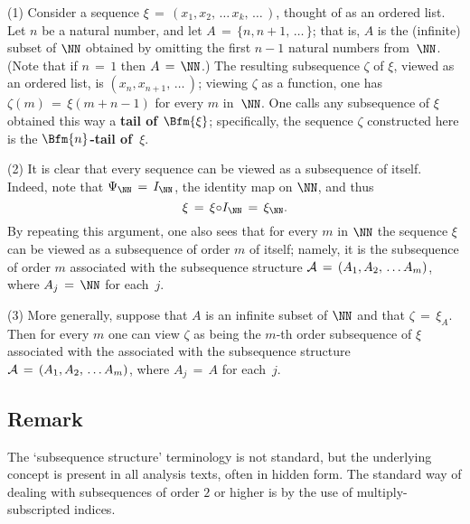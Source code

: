 \hspace*{\parindent}(1) Consider a sequence ${\xi} \,=\, (x_{1}, x_{2},\,{\ldots}\,x_{k},\,{\ldots}\,)$, thought of as an ordered list.
    Let $n$ be a natural number, and let $A \,=\, \{n, n+1, \,{\ldots}\,\}$; that is,
    $A$ is the (infinite) subset of ${\NN}$ obtained by omitting the first $n-1$ natural numbers from~${\NN}$. (Note that if $n \,=\, 1$ then $A \,=\, {\NN}$.)
    The resulting subsequence ${\zeta}$ of ${\xi}$, viewed as an ordered list, is $(x_{n}, x_{n+1},\,{\ldots}\,)$;
    viewing ${\zeta}$ as a function, one has ${\zeta}(m) \,=\, {\xi}(m+n-1)$ for every $m$ in~${\NN}$.
    One calls any subsequence of ${\xi}$ obtained this way a {\bf tail of $\Bfm{{\xi}}$};
    specifically, the sequence ${\zeta}$ constructed here is the {\bf $\Bfm{n}$-tail of~${\xi}$}.

\V

        (2) It is clear that every sequence can be viewed as a subsequence of itself.
    Indeed, note that ${\Psi}_{{\NN}} \,=\, I_{{\NN}}$, the identity map on ${\NN}$, and thus
        \begin{displaymath}
        {\xi} \,=\, {\xi}{\circ}I_{{\NN}} \,=\, {\xi}_{{\NN}}.
        \end{displaymath}
    By repeating this argument, one also sees that for every $m$ in ${\NN}$ the sequence ${\xi}$ can be viewed as a subsequence of order $m$ of itself;
    namely, it is the subsequence of order $m$ associated with the subsequence structure
    ${\cal A} \,=\, (A_{1}, A_{2},\,{\ldots}\,A_{m})$, where $A_{j} \,=\, {\NN}$ for each~$j$.


\V

        (3) More generally, suppose that $A$ is an infinite subset of ${\NN}$ and that ${\zeta} \,=\, {\xi}_{A}$.
    Then for every $m$ one can view ${\zeta}$ as being the $m$-th order subsequence of ${\xi}$ associated with the associated with the subsequence structure ${\cal A} \,=\, (A_{1}, A_{2},\,{\ldots}\,A_{m})$, where $A_{j} \,=\, A$ for each~$j$.

\VV


        \subsection{\small{{\bf Remark}}}
        \label{RemrkA40.42A}

\V

        The `subsequence structure' terminology is not standard, but the underlying concept is present in all analysis texts, often in hidden form.
    The standard way of dealing with subsequences of order $2$ or higher is by the use of multiply-subscripted indices.

